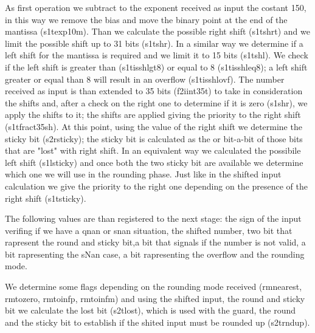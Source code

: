 As first operation we subtract to the exponent received as input the costant 150, in this way we remove the bias and move the binary point at the end of the mantissa (s1t\textunderscore exp10m).
Than we calculate the possible right shift (s1t\textunderscore shr\textunderscore t) and we limit the possible shift up to 31 bits (s1t\textunderscore shr). In a similar way we determine if a left shift for the mantissa is required and we limit it to 15 bits (s1t\textunderscore shl). We check if the left shift is greater than (s1t\textunderscore is\textunderscore shl\textunderscore gt8) or equal to 8 (s1t\textunderscore is\textunderscore shl\textunderscore eq8); a left shift greater or equal than 8 will result in an overflow (s1t\textunderscore is\textunderscore shl\textunderscore ovf). 
The number received as input is than extended to 35 bits (f2i\textunderscore int35\textunderscore t) to take in consideration the shifts and, after a check on the right one to determine if it is zero (s1\textunderscore shr), we apply the shifts to it; the shifts are applied giving the priority to the right shift (s1t\textunderscore fract35sh). 
At this point, using the value of the right shift we determine the sticky bit (s2r\textunderscore sticky); the sticky bit is calculated as the or bit-a-bit of those bits that are "lost" with right shift.
In an equivalent way we calculated the possibile left shift (s1l\textunderscore sticky) and once both the two sticky bit are available we determine which one we will use in the rounding phase. Just like in the shifted input calculation we give the priority to the right one depending on the presence of the right shift (s1t\textunderscore sticky).

The following values are than registered to the next stage: the sign of the input verifing if we have a qnan or snan situation, the shifted number, two bit that rapresent the round and sticky bit,a bit that signals if the number is not valid, a bit rapresenting the sNan case, a bit rapresenting the overflow and the rounding mode.

We determine some flags depending on the rounding mode received (rm\textunderscore nearest, rm\textunderscore to\textunderscore zero, rm\textunderscore to\textunderscore infp, rm\textunderscore to\textunderscore infm) and using the shifted input, the round and sticky bit we calculate the lost bit (s2t\textunderscore lost), which is used with the guard, the round and the sticky bit to establish if the shited input must be rounded up (s2t\textunderscore rnd\textunderscore up).

